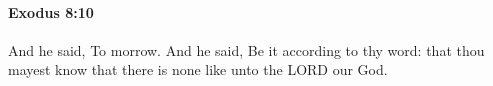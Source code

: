 
		\paragraph{Exodus 8:10} %
			\label{EXODUS-8-10}

			And he said, To morrow. And he said, Be it according to thy word: that thou mayest know that there is none like unto the LORD our God.



